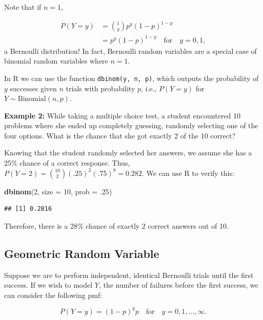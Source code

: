\documentclass[
]{krantz}
\newenvironment{Shaded}{\begin{snugshade}}{\end{snugshade}}
\newcommand{\AttributeTok}[1]{\textcolor[rgb]{0.27,0.27,0.27}{#1}}
\newcommand{\DecValTok}[1]{\textcolor[rgb]{0.06,0.06,0.06}{#1}}
\newcommand{\FunctionTok}[1]{\textcolor[rgb]{0.27,0.27,0.27}{\textbf{#1}}}
\newcommand{\NormalTok}[1]{#1}
\begin{document}
\vspace{2cm}

Note that if \(n=1\),

\begin{align*}
 P(Y=y) &= \binom{1}{y} p^y(1-p)^{1-y} \\
        &= p^y(1-p)^{1-y}\quad \textrm{for}\quad y = 0, 1,
\end{align*}
a Bernoulli distribution! In fact, Bernoulli random variables are a special case of binomial random variables where \(n=1\).

In R we can use the function \texttt{dbinom(y,\ n,\ p)}, which outputs the probability of \(y\) successes given \(n\) trials with probability \(p\), i.e., \(P(Y=y)\) for \(Y \sim \textrm{Binomial}(n,p)\).

\textbf{Example 2:} While taking a multiple choice test, a student encountered 10 problems where she ended up completely guessing, randomly selecting one of the four options. What is the chance that she got exactly 2 of the 10 correct?

Knowing that the student randomly selected her answers, we assume she has a 25\% chance of a correct response. Thus, \(P(Y=2) = {10 \choose 2}(.25)^2(.75)^8 = 0.282\). We can use R to verify this:

\begin{Shaded}
\begin{Highlighting}[]
\FunctionTok{dbinom}\NormalTok{(}\DecValTok{2}\NormalTok{, }\AttributeTok{size =} \DecValTok{10}\NormalTok{, }\AttributeTok{prob =}\NormalTok{ .}\DecValTok{25}\NormalTok{)}
\end{Highlighting}
\end{Shaded}

\begin{verbatim}
## [1] 0.2816
\end{verbatim}

Therefore, there is a 28\% chance of exactly 2 correct answers out of 10.

\subsection{Geometric Random Variable}\label{geometric-random-variable}

Suppose we are to perform independent, identical Bernoulli trials until the first success. If we wish to model \(Y\), the number of failures before the first success, we can consider the following pmf:

\begin{equation}
P(Y=y) = (1-p)^yp \quad \textrm{for}\quad y = 0, 1, \ldots, \infty.
\label{eq:geomRV}
\end{equation}
\end{document}
